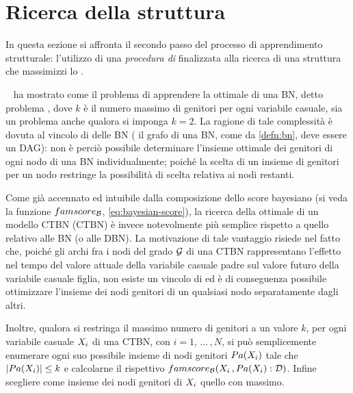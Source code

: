 \section{Ricerca della struttura}\label{sec:structurallearning-search}
In questa sezione si affronta il secondo passo del processo di apprendimento strutturale: l'utilizzo di una \emph{procedura di } finalizzata alla ricerca di una struttura che massimizzi lo \emph{}.

~\citet{Chickering1994} ha mostrato come il problema di apprendere la  ottimale di una \acl{BN}, detto problema \emph{}, dove $k$ è il numero massimo di genitori per ogni variabile casuale, sia un problema \emph{} anche qualora si imponga $k=2$. La ragione di tale complessità è dovuta al vincolo di  delle \acs{BN} (\ie{} il grafo di una \acs{BN}, come da \autoref{defn:bn}, deve essere un \acs{DAG}): non è perciò possibile determinare l'insieme ottimale dei genitori di ogni nodo di una \acs{BN} individualmente; poiché la scelta di un insieme di genitori per un nodo restringe la possibilità di scelta relativa ai nodi restanti.

Come già accennato ed intuibile dalla composizione dello score bayesiano (si veda la funzione $famscore_{\mathcal{B}}$, \autoref{eq:bayesian-score}), la ricerca della  ottimale di un modello \acl{CTBN} (\acs{CTBN}) è invece notevolmente più semplice rispetto a quello relativo alle \acs{BN} (o alle \acs{DBN}). La motivazione di tale vantaggio risiede nel fatto che, poiché gli archi fra i nodi del grado $\mathcal{G}$ di una \acs{CTBN} rappresentano l'effetto nel tempo del valore attuale della variabile casuale padre sul valore futuro della variabile casuale figlia, non esiste un vincolo di  ed è di conseguenza possibile ottimizzare l'insieme dei nodi genitori di un qualsiasi nodo separatamente dagli altri.

Inoltre, qualora si restringa il massimo numero di genitori a un valore $k$, per ogni variabile casuale $\mathnormal{X}_i$ di una \acs{CTBN}, con $i=1,\,\dotsc\,,N$, si può semplicemente enumerare ogni suo possibile insieme di nodi genitori $Pa(\mathnormal{X}_i)$ tale che $\arrowvert Pa(\mathnormal{X}_i) \arrowvert \leq k$ e calcolarne il rispettivo  $famscore_{\mathcal{B}}(\mathnormal{X}_i\,,Pa(\mathnormal{X}_i):\mathcal{D})$. Infine scegliere come insieme dei nodi genitori di $\mathnormal{X}_i$ quello con  massimo.

